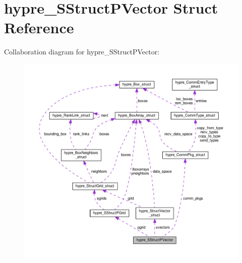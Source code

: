 \hypertarget{structhypre__SStructPVector}{}\section{hypre\+\_\+\+S\+Struct\+P\+Vector Struct Reference}
\label{structhypre__SStructPVector}


Collaboration diagram for hypre\+\_\+\+S\+Struct\+P\+Vector\+:
\nopagebreak
\begin{figure}[H]
\begin{center}
\leavevmode
\includegraphics[width=350pt]{structhypre__SStructPVector__coll__graph}
\end{center}
\end{figure}
